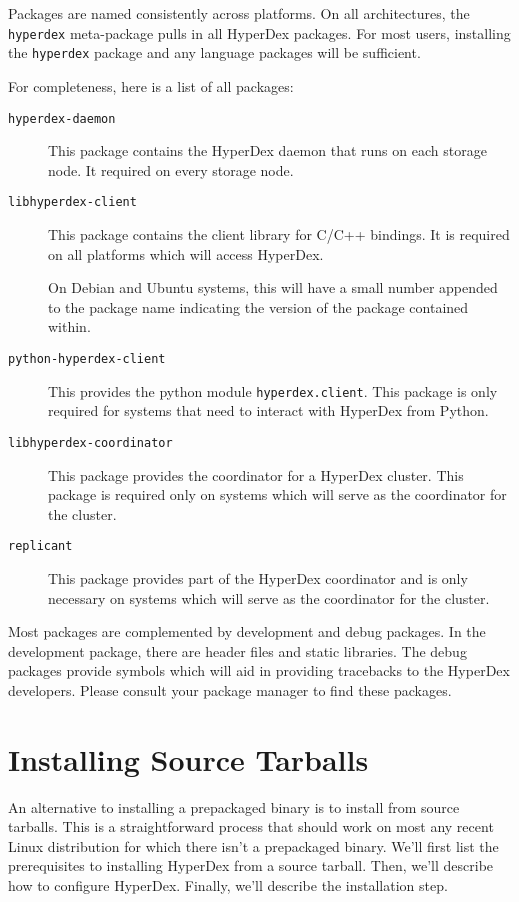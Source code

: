 Packages are named consistently across platforms.  On all architectures, the
\texttt{hyperdex} meta-package pulls in all HyperDex packages.  For most users,
installing the \texttt{hyperdex} package and any language packages will be
sufficient.

For completeness, here is a list of all packages:

\begin{description}
\item[\texttt{hyperdex-daemon}]
This package contains the HyperDex daemon that runs on each storage node.  It
required on every storage node.

\item[\texttt{libhyperdex-client}]
This package contains the client library for C/C++ bindings.  It is required on
all platforms which will access HyperDex.

On Debian and Ubuntu systems, this will have a small number appended to the
package name indicating the version of the package contained within.

\item[\texttt{python-hyperdex-client}]
This provides the python module \texttt{hyperdex.client}.  This package is only
required for systems that need to interact with HyperDex from Python.

\item[\texttt{libhyperdex-coordinator}]
This package provides the coordinator for a HyperDex cluster.  This package is
required only on systems which will serve as the coordinator for the cluster.

\item[\texttt{replicant}]
This package provides part of the HyperDex coordinator and is only necessary on
systems which will serve as the coordinator for the cluster.
\end{description}

Most packages are complemented by development and debug packages.  In the
development package, there are header files and static libraries.  The debug
packages provide symbols which will aid in providing tracebacks to the HyperDex
developers.  Please consult your package manager to find these packages.

\section{Installing Source Tarballs}
\label{sec:installation:source}

An alternative to installing a prepackaged binary is to install from source
tarballs.  This is a straightforward process that should work on most any recent
Linux distribution for which there isn't a prepackaged binary.  We'll first list
the prerequisites to installing HyperDex from a source tarball.  Then, we'll
describe how to configure HyperDex.  Finally, we'll describe the installation
step.

